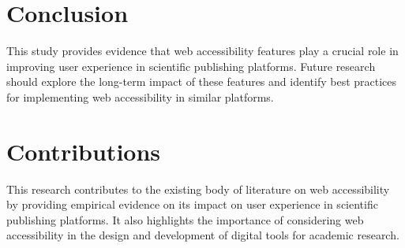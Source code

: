 \documentclass{article}
\begin{document}
\section{Conclusion}
This study provides evidence that web accessibility features play a crucial role in improving user experience in scientific publishing platforms. Future research should explore the long-term impact of these features and identify best practices for implementing web accessibility in similar platforms.

\section{Contributions}
This research contributes to the existing body of literature on web accessibility by providing empirical evidence on its impact on user experience in scientific publishing platforms. It also highlights the importance of considering web accessibility in the design and development of digital tools for academic research.



\end{document}
